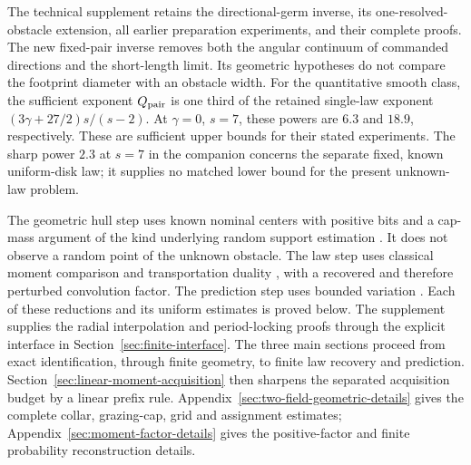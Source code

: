 The technical supplement retains the directional-germ inverse, its
one-resolved-obstacle extension, all earlier preparation experiments,
and their complete proofs. The new fixed-pair inverse removes both
the angular continuum of commanded directions and the short-length
limit. Its geometric hypotheses do not compare the footprint diameter
with an obstacle width. For the quantitative smooth class, the
sufficient exponent $Q_{\rm pair}$ is one third of the retained
single-law exponent $(3\gamma+27/2)s/(s-2)$. At $\gamma=0$, $s=7$,
these powers are $6.3$ and $18.9$, respectively. These are sufficient
upper bounds for their stated experiments. The sharp power $2.3$
at $s=7$ in the companion concerns the separate fixed, known
uniform-disk law; it supplies no matched lower bound for the present
unknown-law problem.

The geometric hull step uses known nominal centers with positive
bits and a cap-mass argument of the kind underlying random support
estimation \cite{BrunelCaps}. It does not observe a random point of
the unknown obstacle. The law step uses classical moment comparison
and transportation duality \cite{RigolletWeed}, with a recovered and
therefore perturbed convolution factor. The prediction step uses
bounded variation \cite{AFP,Galerne}. Each of these reductions and
its uniform estimates is proved below. The supplement supplies the
radial interpolation and period-locking proofs through the explicit
interface in Section~\ref{sec:finite-interface}. The three main
sections proceed from exact identification, through finite geometry,
to finite law recovery and prediction. Section~\ref{sec:linear-moment-acquisition}
then sharpens the separated acquisition budget by a linear prefix rule. Appendix~\ref{sec:two-field-geometric-details}
gives the complete collar, grazing-cap, grid and assignment estimates;
Appendix~\ref{sec:moment-factor-details} gives the positive-factor
and finite probability reconstruction details.
